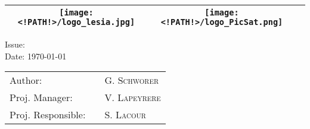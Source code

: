 \thispagestyle{empty}%
\begin{center}%
\begin{tabularx}{\linewidth}{| c | c | X |}%
\hline%
\texttt{[image: <!PATH!>/logo\_lesia.jpg]} & \texttt{[image: <!PATH!>/logo\_PicSat.png]} & \\%
\hline%
\end{tabularx}%
%
\vfill%
%
\Huge{\textbf{\textsc{\mytitle}}}%
%
\vfill{}%
%
\huge{Issue: \version}\\[0.5cm]%
\huge{Date: \today{}}%
%
\vfill%
%
\Large{%
\begin{tabularx}{0.8\linewidth}{l X l}%
Author: & & \textsc{G. Schworer} \\%
Proj. Manager: & & \textsc{V. Lapeyrere} \\%
Proj. Responsible: & & \textsc{S. Lacour} \\%
\end{tabularx}%
}%
\vfill%
%
\end{center}%
%
\clearpage%
\null%
\vspace{2cm}%
\maketitle%
\tableofcontents%
\clearpage%